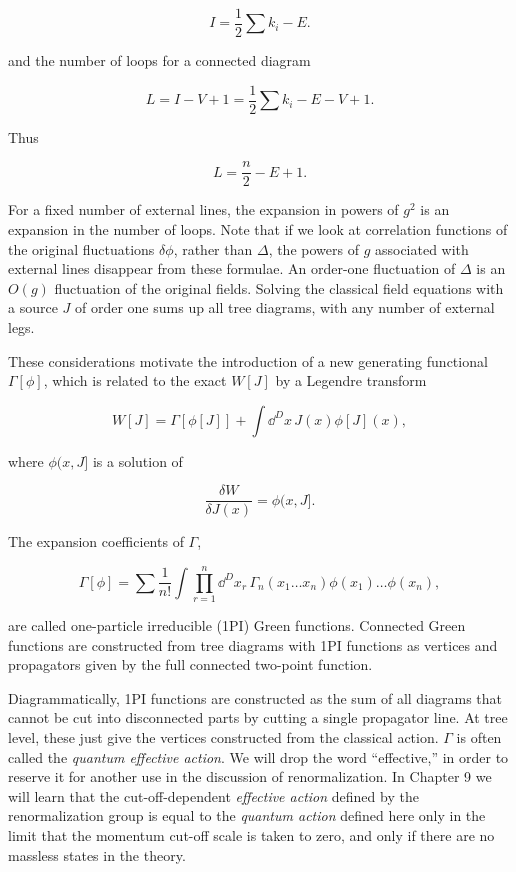 \[
I=\frac12\sum k_i-E.
\]

and the number of loops for a connected diagram

\[
L=I-V+1=\frac12\sum k_i-E-V+1.
\]

Thus

\[
L=\frac n2-E+1.
\]

For a fixed number of external lines, the expansion in powers of $g^2$ is an expansion
in the number of loops. Note that if we look at correlation functions of the original
fluctuations $\delta\phi$, rather than $\Delta$, the powers of $g$ associated with external lines disappear
from these formulae. An order-one fluctuation of $\Delta$ is an $O(g)$ fluctuation of the original
fields. Solving the classical field equations with a source $J$ of order one sums up all tree
diagrams, with any number of external legs.

These considerations motivate the introduction of a new generating functional $\Gamma[\phi]$,
which is related to the exact $W[J]$ by a Legendre transform

\begin{equation}
W[J]=\Gamma[\phi[J]]+\int\dd^D x\,J(x)\phi[J](x),
\label{eq:3.32}
\end{equation}

where $\phi(x,J]$ is a solution of

\begin{equation}
\frac{\delta W}{\delta J(x)}=\phi(x,J].
\label{eq:3.33}
\end{equation}

The expansion coefficients of $\Gamma$,

\begin{equation}
\Gamma[\phi]=\sum\frac{1}{n!}\int\prod_{r=1}^n\dd^D x_r\,\Gamma_n(x_1\ldots x_n)\phi(x_1)\ldots\phi(x_n),
\label{eq:3.34}
\end{equation}

are called one-particle irreducible (1PI) Green functions. Connected Green functions
are constructed from tree diagrams with 1PI functions as vertices and propagators
given by the full connected two-point function.

Diagrammatically, 1PI functions are constructed as the sum of all diagrams that
cannot be cut into disconnected parts by cutting a single propagator line. At tree level,
these just give the vertices constructed from the classical action. $\Gamma$ is often called the
\emph{quantum effective action}. We will drop the word ``effective,'' in order to reserve it for
another use in the discussion of renormalization. In Chapter 9 we will learn that the
cut-off-dependent \emph{effective action} defined by the renormalization group is equal to the
\emph{quantum action} defined here only in the limit that the momentum cut-off scale is taken
to zero, and only if there are no massless states in the theory.
